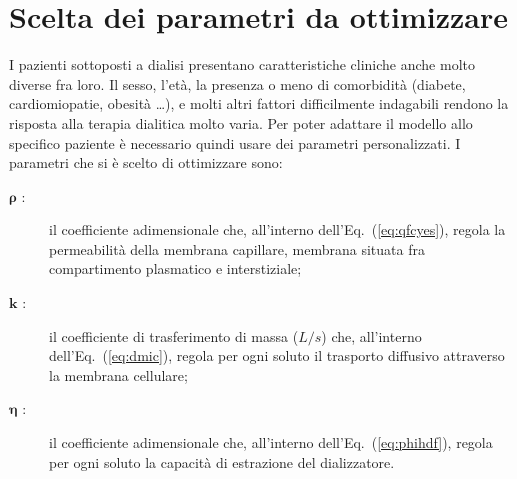 \section{Scelta dei parametri da ottimizzare}\label{sec:calibrazione}
I pazienti sottoposti a dialisi presentano caratteristiche cliniche anche molto diverse fra loro. Il sesso, l'età, la presenza o meno di comorbidità (diabete, cardiomiopatie, obesità \ldots), e molti altri fattori difficilmente indagabili rendono la risposta alla terapia dialitica molto varia. Per poter adattare il modello allo specifico paziente è necessario quindi usare dei parametri personalizzati. I parametri che si è scelto di ottimizzare sono:
\begin{description}
	\item [$\boldsymbol{\rho}$ :] il coefficiente adimensionale che, all'interno dell'Eq.~(\ref{eq:qfcyes}), regola la permeabilità della membrana capillare, membrana situata fra compartimento plasmatico e interstiziale;
	\item [$\mathbf{k}$ :] il coefficiente di trasferimento di massa ($L/s$) che, all'interno dell'Eq.~(\ref{eq:dmic}), regola per ogni soluto il trasporto diffusivo attraverso la membrana cellulare;
	\item [$\boldsymbol{\eta}$ :] il coefficiente adimensionale che, all'interno dell'Eq.~(\ref{eq:phihdf}), regola per ogni soluto la capacità di estrazione del dializzatore.
\end{description}
